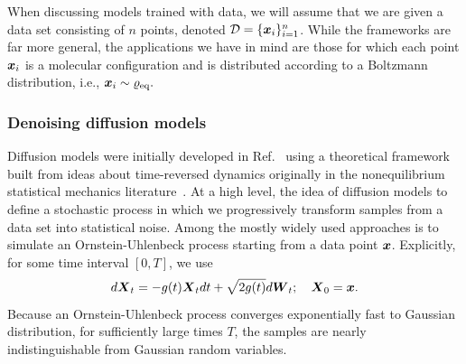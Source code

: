 \documentclass[11pt]{article}
\begin{document}
When discussing models trained with data, we will assume that we are given a data set consisting of $n$ points, denoted $\mathcal{D} = \{ \boldsymbol{x}_i \}_{i=1}^n$.
While the frameworks are far more general, the applications we have in mind are those for which each point $\boldsymbol{x}_i$ is a molecular configuration and is distributed according to a Boltzmann distribution, i.e., $\boldsymbol{x}_i \sim \varrho_{\rm eq}.$

\subsubsection{Denoising diffusion models}

Diffusion models were initially developed in Ref.~\cite{sohl-dickstein_hamiltonian_2012} using a theoretical framework built from ideas about time-reversed dynamics originally in the nonequilibrium statistical mechanics literature~\cite{crooks_entropy_1999, kurchan_fluctuation_1998, lebowitz_gallavotticohen-type_1999}. 
At a high level, the idea of diffusion models to define a stochastic process in which we progressively transform samples from a data set into statistical noise.
Among the mostly widely used approaches is to simulate an Ornstein-Uhlenbeck process starting from a data point $\boldsymbol{x}$.
Explicitly, for some time interval $[0, T]$, we use
\begin{equation}
    d\boldsymbol{X}_t = - g(t) \boldsymbol{X}_t dt + \sqrt{2 g(t)} d\boldsymbol{W}_t; \quad \boldsymbol{X}_0 = \boldsymbol{x}.
    \label{eq:ou}
\end{equation}
Because an Ornstein-Uhlenbeck process converges exponentially fast to Gaussian distribution, for sufficiently large times $T$, the samples are nearly indistinguishable from Gaussian random variables. 
\end{document}
